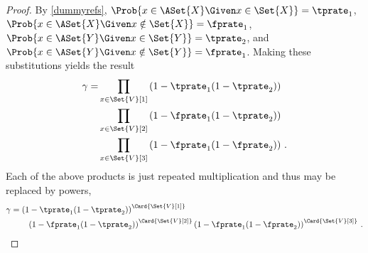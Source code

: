\begin{proof}
    By \cref{dummyrefs}, $\Prob{x \in \ASet{X} \Given x \in \Set{X}} = \tprate_1$, 
    $\Prob{x \in \ASet{X} \Given x \notin \Set{X}} = \fprate_1$, $\Prob{x \in 
    \ASet{Y} \Given x \in \Set{Y}} = \tprate_2$, and $\Prob{x \in \ASet{Y} \Given x 
    \notin \Set{Y}} = \fprate_1$. Making these substitutions yields the result
    \begin{equation}
    \begin{split}
    \gamma =
        &\prod_{x \in \Set{V}[1]}
        \left(1 -
            \tprate_1
            (1 - \tprate_2)
        \right)\\
        &\prod_{x \in \Set{V}[2]}
        \left(1 -
            \fprate_1
            (1 - \tprate_2)
        \right)\\
        &\prod_{x \in \Set{V}[3]}
        \left(1 -
            \fprate_1
            (1 - \fprate_2)
        \right)\,.  
    \end{split}    
    \end{equation}
    Each of the above products is just repeated multiplication and thus may be 
    replaced by powers,
    \begin{equation}
    \begin{split}
    \gamma &=
        \left(1 - \tprate_1(1 - \tprate_2)\right)^{\Card{\Set{V}[1]}}\\
        &\qquad \left(1 - \fprate_1(1 - \tprate_2)\right)^{\Card{\Set{V}[2]}}
        \left(1 - \fprate_1(1 - \fprate_2)\right)^{\Card{\Set{V}[3]}}\,.  
    \end{split}
    \end{equation}



































\end{proof}

